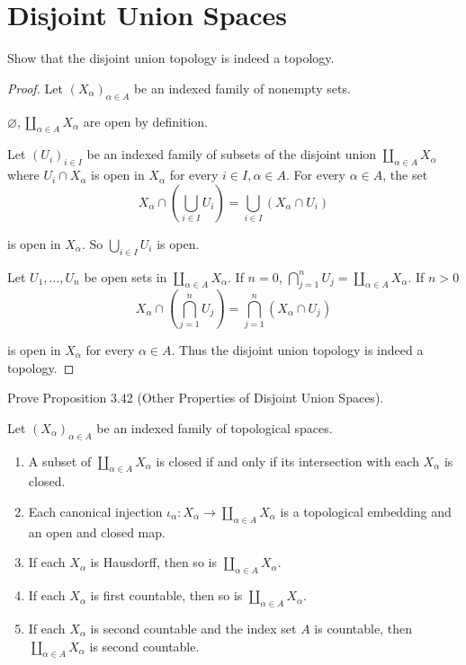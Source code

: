 \section*{Disjoint Union Spaces}

\begin{exercise}{3.40}
	Show that the disjoint union topology is indeed a topology.
\end{exercise}

\begin{proof}
	Let ${(X_{\alpha})}_{\alpha\in A}$ be an indexed family of nonempty sets.

	$\varnothing, \coprod_{\alpha\in A}X_{\alpha}$ are open by definition.

	Let ${(U_{i})}_{i\in I}$ be an indexed family of subsets of the disjoint union $\coprod_{\alpha\in A}X_{\alpha}$ where $U_{i}\cap X_{\alpha}$ is open in $X_{\alpha}$ for every $i\in I, \alpha\in A$. For every $\alpha\in A$, the set
	\[
		X_{\alpha}\cap \left(\bigcup_{i\in I}U_{i}\right) = \bigcup_{i\in I}(X_{\alpha}\cap U_{i})
	\]

	is open in $X_{\alpha}$. So $\bigcup_{i\in I}U_{i}$ is open.

	Let $U_{1}, \ldots, U_{n}$ be open sets in $\coprod_{\alpha\in A}X_{\alpha}$. If $n = 0$, $\bigcap^{n}_{j=1}U_{j} = \coprod_{\alpha\in A}X_{\alpha}$. If $n > 0$
	\[
		X_{\alpha}\cap \left(\bigcap^{n}_{j=1}U_{j}\right) = \bigcap^{n}_{j=1}(X_{\alpha}\cap U_{j})
	\]

	is open in $X_{\alpha}$ for every $\alpha\in A$. Thus the disjoint union topology is indeed a topology.
\end{proof}

\begin{exercise}{3.43}\label{exercise:3.43}
	Prove Proposition 3.42 (Other Properties of Disjoint Union Spaces).

	Let ${(X_{\alpha})}_{\alpha\in A}$ be an indexed family of topological spaces.
	\begin{enumerate}[label={(\alph*)}]
		\item A subset of $\coprod_{\alpha\in A}X_{\alpha}$ is closed if and only if its intersection with each $X_{\alpha}$ is closed.
		\item Each canonical injection $\iota_{\alpha}: X_{\alpha}\to \coprod_{\alpha\in A}X_{\alpha}$ is a topological embedding and an open and closed map.
		\item If each $X_{\alpha}$ is Hausdorff, then so is $\coprod_{\alpha\in A}X_{\alpha}$.
		\item If each $X_{\alpha}$ is first countable, then so is $\coprod_{\alpha\in A}X_{\alpha}$.
		\item If each $X_{\alpha}$ is second countable and the index set $A$ is countable, then $\coprod_{\alpha\in A}X_{\alpha}$ is second countable.
	\end{enumerate}
\end{exercise}

